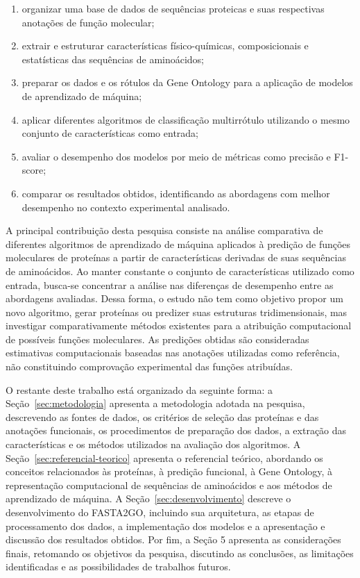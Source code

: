\begin{enumerate}
    \item organizar uma base de dados de sequências proteicas e suas respectivas anotações de função molecular;
    \item extrair e estruturar características físico-químicas, composicionais e estatísticas das sequências de aminoácidos;
    \item preparar os dados e os rótulos da Gene Ontology para a aplicação de modelos de aprendizado de máquina;
    \item aplicar diferentes algoritmos de classificação multirrótulo utilizando o mesmo conjunto de características como entrada;
    \item avaliar o desempenho dos modelos por meio de métricas como precisão e F1-score;
    \item comparar os resultados obtidos, identificando as abordagens com melhor desempenho no contexto experimental analisado.
\end{enumerate}

A principal contribuição desta pesquisa consiste na análise comparativa de diferentes algoritmos de aprendizado de máquina aplicados à predição de funções moleculares de proteínas a partir de características derivadas de suas sequências de aminoácidos. Ao manter constante o conjunto de características utilizado como entrada, busca-se concentrar a análise nas diferenças de desempenho entre as abordagens avaliadas. Dessa forma, o estudo não tem como objetivo propor um novo algoritmo, gerar proteínas ou predizer suas estruturas tridimensionais, mas investigar comparativamente métodos existentes para a atribuição computacional de possíveis funções moleculares. As predições obtidas são consideradas estimativas computacionais baseadas nas anotações utilizadas como referência, não constituindo comprovação experimental das funções atribuídas.

O restante deste trabalho está organizado da seguinte forma: 
a Seção~\ref{sec:metodologia} apresenta a metodologia adotada na pesquisa, descrevendo as fontes de dados, os critérios de seleção das proteínas e das anotações funcionais, os procedimentos de preparação dos dados, a extração das características e os métodos utilizados na avaliação dos algoritmos. 
A Seção~\ref{sec:referencial-teorico} apresenta o referencial teórico, abordando os conceitos relacionados às proteínas, à predição funcional, à Gene Ontology, à representação computacional de sequências de aminoácidos e aos métodos de aprendizado de máquina.
A Seção~\ref{sec:desenvolvimento} descreve o desenvolvimento do FASTA2GO, incluindo sua arquitetura, as etapas de processamento dos dados, a implementação dos modelos e a apresentação e discussão dos resultados obtidos. Por fim, a Seção 5 apresenta as considerações finais, retomando os objetivos da pesquisa, discutindo as conclusões, as limitações identificadas e as possibilidades de trabalhos futuros.

